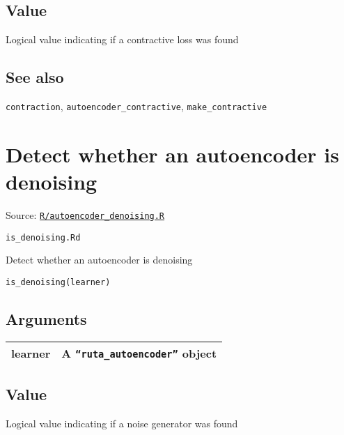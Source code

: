 \hypertarget{value}{\subsection{\texorpdfstring{\protect\hyperlink{value}{}Value}{Value}}\label{value}}

Logical value indicating if a contractive loss was found

\hypertarget{see-also}{\subsection{\texorpdfstring{\protect\hyperlink{see-also}{}See
also}{See also}}\label{see-also}}

\texttt{contraction}, \texttt{autoencoder\_contractive},
\texttt{make\_contractive}

\section{Detect whether an autoencoder is
denoising}\label{detect-whether-an-autoencoder-is-denoising}

Source:
\href{https://github.com/fdavidcl/ruta/blob/master/R/autoencoder_denoising.R}{\texttt{R/autoencoder\_denoising.R}}

\texttt{is\_denoising.Rd}

Detect whether an autoencoder is denoising

\begin{verbatim}
is_denoising(learner)
\end{verbatim}

\hypertarget{arguments}{\subsection{\texorpdfstring{\protect\hyperlink{arguments}{}Arguments}{Arguments}}\label{arguments}}

\begin{longtable}[c]{@{}>{\small}p{3cm}>{\raggedright}p{12.5cm}@{}}
\toprule
learner & A \texttt{``ruta\_autoencoder''} object\tabularnewline
\bottomrule
\end{longtable}

\hypertarget{value}{\subsection{\texorpdfstring{\protect\hyperlink{value}{}Value}{Value}}\label{value}}

Logical value indicating if a noise generator was found

